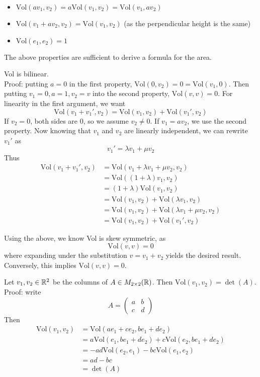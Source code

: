 \documentclass[12pt]{article}
\begin{document}
\begin{itemize}
	\item $\mathrm{Vol}(av_1, v_2) = a\mathrm{Vol}(v_1, v_2) = \mathrm{Vol}(v_1, av_2)$
	\item $\mathrm{Vol}(v_1 + av_2, v_2) = \mathrm{Vol}(v_1, v_2)$ (as the perpendicular height is the same)
	\item $\mathrm{Vol}(e_1, e_2) = 1$
\end{itemize}

The above properties are sufficient to derive a formula for the area.

\begin{lem}
	Vol is bilinear. \\
	Proof: putting $a=0$ in the first property, $\mathrm{Vol}(0, v_2) = 0 = \mathrm{Vol}(v_1, 0)$. Then putting $v_1 = 0, a = 1, v_2 = v$ into the second property, $\mathrm{Vol}(v, v) = 0$. For linearity in the first argument, we want
	$$\mathrm{Vol}(v_1 + v_1', v_2) = \mathrm{Vol}(v_1, v_2) + \mathrm{Vol}(v_1', v_2)$$
	If $v_2 = 0$, both sides are 0, so we assume $v_2 \neq 0$. If $v_1 = av_2$, we use the second property. Now knowing that $v_1$ and $v_2$ are linearly independent, we can rewrite $v_1'$ as
	$$v_1' = \lambda v_1 + \mu v_2$$
	Thus
	\begin{align*}
		\mathrm{Vol}(v_1 + v_1', v_2) &= \mathrm{Vol}(v_1 + \lambda v_1 + \mu v_2, v_2) \\
					      &= \mathrm{Vol}((1+\lambda)v_1, v_2) \\
					      &= (1+\lambda)\mathrm{Vol}(v_1, v_2) \\
					      &= \mathrm{Vol}(v_1, v_2) + \mathrm{Vol}(\lambda v_1, v_2) \\
					      &= \mathrm{Vol}(v_1, v_2) + \mathrm{Vol}(\lambda v_1 + \mu v_2, v_2) \\
					      &= \mathrm{Vol}(v_1, v_2) + \mathrm{Vol}(v_1', v_2)
	\end{align*}
\end{lem}

Using the above, we know Vol is skew symmetric, as
$$\mathrm{Vol}(v, v) = 0$$
where expanding under the substitution $v = v_1 + v_2$ yields the desired result. Conversely, this implies $\mathrm{Vol}(v,v) = 0$.

\begin{prop}
	Let $v_1, v_2 \in \mathbb{R}^2$ be the columns of $A \in M_{2\times 2}(\mathbb{R})$. Then $\mathrm{Vol}(v_1, v_2) = \det(A)$. \\
	Proof: write
	$$A = \begin{pmatrix} a & b \\ c & d \end{pmatrix}$$
	Then
	\begin{align*}
		\mathrm{Vol}(v_1, v_2) &= \mathrm{Vol}(ae_1 + ce_2, be_1 + de_2) \\
				       &= a\mathrm{Vol}(e_1, be_1 + de_2) + c\mathrm{Vol}(e_2, be_1 + de_2) \\
				       &= -ad\mathrm{Vol}(e_2, e_1) - bc\mathrm{Vol}(e_1, e_2) \\
				       &= ad - bc \\
				       &= \det(A)
	\end{align*}
\end{prop}
\end{document}
